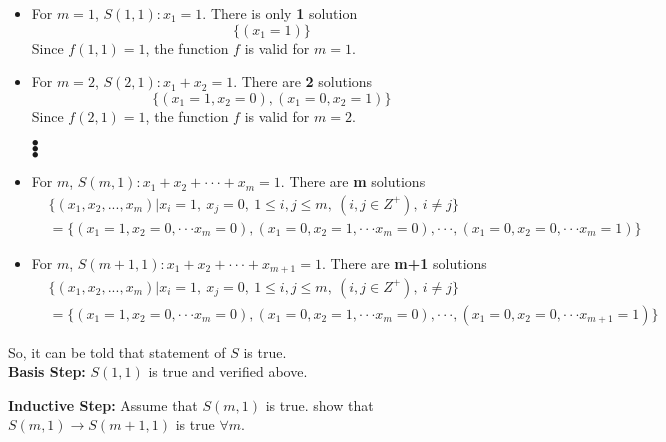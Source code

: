 \documentclass[11pt]{article}
\begin{document}
\begin{itemize}
    \item For $m = 1$, $S(1, 1): x_1 = 1$. There is only \textbf{1} solution
    \begin{equation*}
        \{(x_1 = 1)\}
    \end{equation*}
    Since $f(1, 1) = 1$, the function $f$ is valid for $m = 1$.
    \item For $m = 2$, $S(2, 1): x_1 + x_2 = 1$. There are \textbf{2} solutions
    \begin{equation*}
        \{(x_1 = 1, x_2 = 0), (x_1 = 0, x_2 = 1)\}
    \end{equation*}
    Since $f(2, 1) = 1$, the function $f$ is valid for $m = 2$.
    \begin{center}
        $\bullet$\\
        $\bullet$\\
        $\bullet$\\    
    \end{center}
    \item For $m$, $S(m, 1): x_1 + x_2 + \cdot \cdot \cdot + x_m = 1$. There are \textbf{m} solutions
    \begin{align*}
        &\{(x_1, x_2, ..., x_m) | x_i = 1,\ x_j = 0,\ 1 \leq i, j \leq m,\ (i, j \in Z^+),\ i \neq j\}\\
        &= \{(x_1 = 1, x_2 = 0, \cdot \cdot \cdot x_m = 0), (x_1 = 0, x_2 = 1, \cdot \cdot \cdot x_m = 0), \cdot \cdot \cdot, (x_1 = 0, x_2 = 0, \cdot \cdot \cdot x_m = 1)\}
    \end{align*}
    \item For $m$, $S(m+1, 1): x_1 + x_2 + \cdot \cdot \cdot + x_{m+1} = 1$. There are \textbf{m+1} solutions
    \begin{align*}
        &\{(x_1, x_2, ..., x_m) | x_i = 1,\ x_j = 0,\ 1 \leq i, j \leq m,\ (i, j \in Z^+),\ i \neq j\}\\
        &= \{(x_1 = 1, x_2 = 0, \cdot \cdot \cdot x_m = 0), (x_1 = 0, x_2 = 1, \cdot \cdot \cdot x_m = 0), \cdot \cdot \cdot, (x_1 = 0, x_2 = 0, \cdot \cdot \cdot x_{m+1} = 1)\}
    \end{align*}
\end{itemize}
So, it can be told that statement of $S$ is true.\\

\textbf{Basis Step:} $S(1, 1)$ is true and verified above.

\textbf{Inductive Step:} Assume that $S(m, 1)$ is true. show that $S(m, 1) \rightarrow S(m+1, 1)$ is true $\forall m$.\\ 
\end{document}
